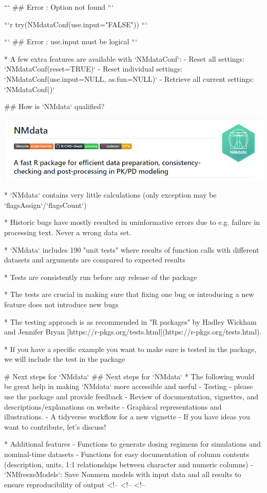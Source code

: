 {{{{{{```
## Error : Option not found
```

```r
try(NMdataConf(use.input="FALSE"))
```

```
## Error : use.input must be logical
```

* A few extra features are available with `NMdataConf`:
- Reset all settings: `NMdataConf(reset=TRUE)` 
- Reset individual settings: `NMdataConf(use.input=NULL, as.fun=NULL)`
- Retrieve all current settings: `NMdataConf()`


## How is `NMdata` qualified?

\includegraphics[width=.8\textwidth]{badges_snip_210623}

* `NMdata` contains very little calculations (only exception may be `flagsAssign`/`flagsCount`)

* Historic bugs have mostly resulted in uninformative errors due to
e.g. failure in processing text. Never a wrong data set.

* `NMdata` includes 190 "unit tests" where results of function calls
with different datasets and arguments are compared to expected
results

* Tests are consistently run before any release of the package

* The tests are crucial in making sure that fixing one bug or
introducing a new feature does not introduce new bugs

* The testing approach is as recommended in "R packages" by Hadley Wickham and Jennifer Bryan [https://r-pkgs.org/tests.html](https://r-pkgs.org/tests.html).

* If you have a specific example you want to make sure is tested in the
package, we will include the test in the package

# Next steps for `NMdata`
## Next steps for `NMdata`
* The following would be great help in making `NMdata` more accessible and useful
- Testing - please use the package and provide feedback
- Review of documentation, vignettes, and descriptions/explanations on website
- Graphical representations and illustrations.
- A tidyverse workflow for a new vignette
- If you have ideas you want to contribute, let's discuss!

* Additional features
- Functions to generate dosing regimens for simulations and
nominal-time datasets
- Functions for easy documentation of column contents (description,
units, 1:1 relationships between character and numeric columns)
- `NMfreezeModels`: Save Nonmem models with input data and all results to ensure reproducibility of output
<!-- %
<!-- %
<!-- %

}}}}}}
